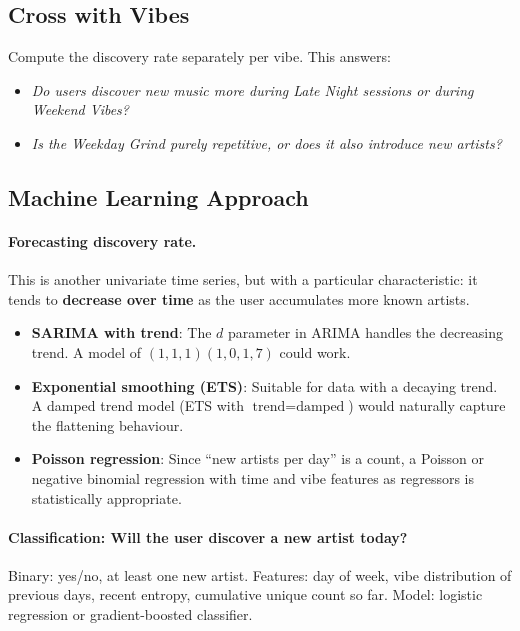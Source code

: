 \documentclass[12pt, a4paper]{article}
\begin{document}
\subsection{Cross with Vibes}

Compute the discovery rate separately per vibe. This answers:
\begin{itemize}
    \item \emph{Do users discover new music more during Late Night sessions
          or during Weekend Vibes?}
    \item \emph{Is the Weekday Grind purely repetitive, or does it also
          introduce new artists?}
\end{itemize}

\subsection{Machine Learning Approach}

\paragraph{Forecasting discovery rate.}
This is another univariate time series, but with a particular characteristic:
it tends to \textbf{decrease over time} as the user accumulates more known
artists.

\begin{itemize}
    \item \textbf{SARIMA with trend}: The $d$ parameter in ARIMA handles
          the decreasing trend. A model of $(1,1,1)(1,0,1,7)$ could work.
    \item \textbf{Exponential smoothing (ETS)}: Suitable for data with a
          decaying trend. A damped trend model (ETS with
          $\text{trend}=\text{damped}$) would naturally capture the
          flattening behaviour.
    \item \textbf{Poisson regression}: Since ``new artists per day'' is a
          count, a Poisson or negative binomial regression with time and
          vibe features as regressors is statistically appropriate.
\end{itemize}

\paragraph{Classification: Will the user discover a new artist today?}
Binary: yes/no, at least one new artist. Features: day of week, vibe
distribution of previous days, recent entropy, cumulative unique count so
far. Model: logistic regression or gradient-boosted classifier.
\end{document}
